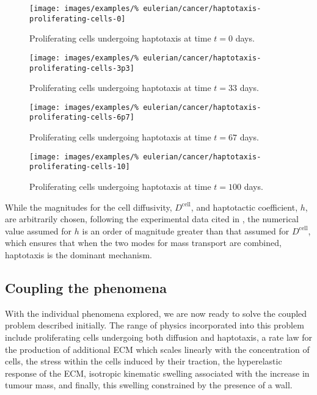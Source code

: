 \begin{figure}[!hptb]
  \centering
  \texttt{[image: images/examples/\%
    eulerian/cancer/haptotaxis-proliferating-cells-0]}
  \caption{Proliferating cells undergoing haptotaxis at time $t=0$
    days.}
  \label{tumour-haptotaxis-proliferation-0}
\end{figure}

\begin{figure}[!hptb]
  \centering
  \texttt{[image: images/examples/\%
    eulerian/cancer/haptotaxis-proliferating-cells-3p3]}
  \caption{Proliferating cells undergoing haptotaxis at time $t=33$
    days.} 
  \label{tumour-haptotaxis-proliferation-3p3}
\end{figure}

\begin{figure}[!hptb]
  \centering
  \texttt{[image: images/examples/\%
    eulerian/cancer/haptotaxis-proliferating-cells-6p7]}
  \caption{Proliferating cells undergoing haptotaxis at time $t=67$
    days.}
  \label{tumour-haptotaxis-proliferation-6p7}
\end{figure}

\begin{figure}[!hptb]
  \centering
  \texttt{[image: images/examples/\%
    eulerian/cancer/haptotaxis-proliferating-cells-10]}
  \caption{Proliferating cells undergoing haptotaxis at time $t=100$
    days.}
  \label{tumour-haptotaxis-proliferation-10}
\end{figure}

While the magnitudes for the cell diffusivity, $D^{\mathrm{cell}}$,
and haptotactic coefficient, $h$, are arbitrarily chosen, following
the experimental data cited in \citet{namyetal:04}, the numerical
value assumed for $h$ is an order of magnitude greater than that
assumed for $D^{\mathrm{cell}}$, which ensures that when the two modes
for mass transport are combined, haptotaxis is the dominant mechanism.

\subsection{Coupling the phenomena}
\label{cacophonous-medley}

With the individual phenomena explored, we are now ready to solve the
coupled problem described initially. The range of physics incorporated
into this problem include proliferating cells undergoing both
diffusion and haptotaxis, a rate law for the production of additional
ECM which scales linearly with the concentration of cells, the stress
within the cells induced by their traction, the hyperelastic response
of the ECM, isotropic kinematic swelling associated with the increase
in tumour mass, and finally, this swelling constrained by the presence
of a wall.

